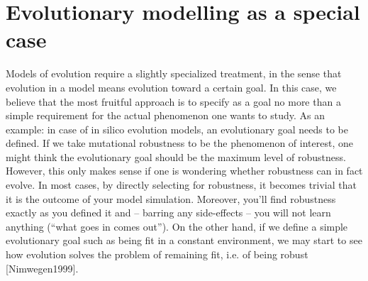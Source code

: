 \section{Evolutionary modelling as a special case}

Models of evolution require a slightly specialized treatment, in the sense that evolution in a model means evolution toward a certain goal. In this case, we believe that the most fruitful approach is to specify as a goal no more than a simple requirement for the actual phenomenon one wants to study. As an example: in case of in silico evolution models, an evolutionary goal needs to be defined. If we take mutational robustness to be the phenomenon of interest, one might think the evolutionary goal should be the maximum level of robustness. However, this only makes sense if one is wondering whether robustness can in fact evolve. In most cases, by directly selecting for robustness, it becomes trivial that it is the outcome of your model simulation. Moreover, you’ll find robustness exactly as you defined it and -- barring any side-effects -- you will not learn anything (“what goes in comes out”). On the other hand, if we define a simple evolutionary goal such as being fit in a constant environment, we may start to see how evolution solves the problem of remaining fit, i.e. of being robust [Nimwegen1999].
  